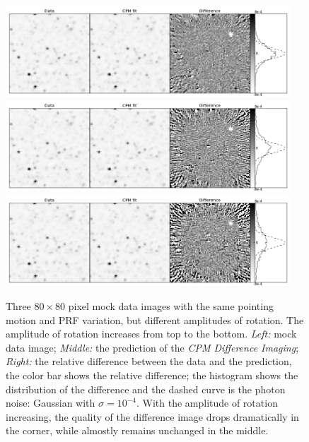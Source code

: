 \documentclass[12pt, preprint]{aastex}
\newcommand{\project}[1]{\textsl{#1}}
\newcommand{\cpmdiff}{\project{CPM Difference Imaging}}
\begin{document}
\begin{figure}[p]
\begin{center}
\includegraphics[width=0.95\textwidth]{f8a}
\includegraphics[width=0.95\textwidth]{f8b}
\includegraphics[width=0.95\textwidth]{f8c}
\end{center}
\caption{
  \label{large_rotation}
  Three $80\times 80$ pixel mock data images with the same pointing motion and PRF variation, but different amplitudes of rotation. The amplitude of rotation increases from top to the bottom.
  \emph{Left:} mock data image;
  \emph{Middle:} the prediction of the \cpmdiff;
  \emph{Right:} the relative difference between the data and the prediction, the color bar shows the relative difference; the histogram shows the distribution of the difference and the dashed curve is the photon noise: Gaussian with $\sigma = 10^{-4}$. 
  With the amplitude of rotation increasing, the quality of the difference image drops dramatically in the corner, while almostly remains unchanged in the middle.
}
\end{figure}
\end{document}
